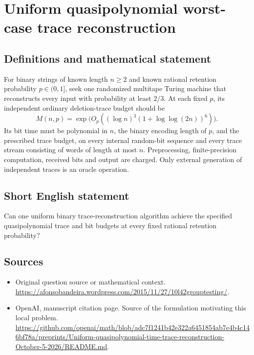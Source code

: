 \documentclass[11pt]{article}
\begin{document}
\section*{Uniform quasipolynomial worst-case trace reconstruction}\label{30007491}
\subsection{Definitions and mathematical statement}
For binary strings of known length $n\ge2$ and known rational retention probability $p\in(0,1]$, seek one randomized multitape Turing machine that reconstructs every input with probability at least $2/3$. At each fixed $p$, its independent ordinary deletion-trace budget should be
\[
 M(n,p)=\exp\bigl(O_p((\log n)^3(1+\log\log(2n))^6)\bigr).
\]
Its bit time must be polynomial in $n$, the binary encoding length of $p$, and the prescribed trace budget, on every internal random-bit sequence and every trace stream consisting of words of length at most $n$. Preprocessing, finite-precision computation, received bits and output are charged. Only external generation of independent traces is an oracle operation.

\subsection{Short English statement}
Can one uniform binary trace-reconstruction algorithm achieve the specified quasipolynomial trace and bit budgets at every fixed rational retention probability?

\subsection{Sources}
\begin{itemize}
\item[S1] Original question source or mathematical context.
\url{https://afonsobandeira.wordpress.com/2015/11/27/10l42grouptesting/}.
\item[S2] OpenAI, manuscript citation page. Source of the formulation motivating this local problem.
\url{https://github.com/openai/math/blob/adc7f1241b42e322a6451854ab7e4b4c146bf78a/preprints/Uniform-quasipolynomial-time-trace-reconstruction-October-5-2026/README.md}.
\end{itemize}
\end{document}

